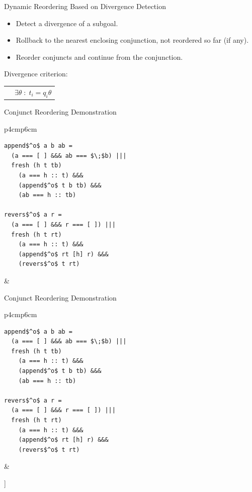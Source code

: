 \documentclass{beamer}
\theoremstyle{definition}
\theoremstyle{plain} %
\begin{document}
\begin{frame}{Dynamic Reordering Based on Divergence Detection}
\vskip5mm
\begin{itemize}
  \item Detect a divergence of a subgoal.
  \item Rollback to the nearest enclosing conjunction, not reordered so far (if any).
  \item Reorder conjuncts and continue from the conjunction. 
\end{itemize}

\vskip8mm
Divergence criterion:
 
\begin{center}
\begin{tabular}{cc}
\noindent\parbox[c]{0.3\hsize}{\Tree [.{$f\;(t_1,\dots,t_k)$} [.{$\dots$} [.{$f\;(q_1,\dots,q_k)$} ] ] ]} & $\exists\theta\;:\;t_i=q_i\theta$
\end{tabular}
\end{center}


\end{frame}

\begin{frame}[fragile]{Conjunct Reordering Demonstration}
  \begin{tabular}{p{4cm}p{6cm}}
    \begin{lstlisting}
append$^o$ a b ab =		
  (a === [ ] &&& ab === $\;$b) |||
  fresh (h t tb) 
    (a === h :: t) &&&
    (append$^o$ t b tb) &&&
    (ab === h :: tb)  
  
revers$^o$ a r =	
  (a === [ ] &&& r === [ ]) |||
  fresh (h t rt) 
    (a === h :: t) &&&
    (append$^o$ rt [h] r) &&&
    (revers$^o$ t rt)
\end{lstlisting}
&
\begin{center}
\end{center}
\end{tabular}
\end{frame}

\begin{frame}[fragile]{Conjunct Reordering Demonstration}
  \begin{tabular}{p{4cm}p{6cm}}
    \begin{lstlisting}
append$^o$ a b ab =		
  (a === [ ] &&& ab === $\;$b) |||
  fresh (h t tb) 
    (a === h :: t) &&&
    (append$^o$ t b tb) &&&
    (ab === h :: tb)  
  
revers$^o$ a r =	
  (a === [ ] &&& r === [ ]) |||
  fresh (h t rt) 
    (a === h :: t) &&&
    (append$^o$ rt [h] r) &&&
    (revers$^o$ t rt)
\end{lstlisting}
&
\begin{center}
   \Tree [.{\lstinline|revers$^o\; [1,\,2,\,3]\; r$|}  [.{$[1,\,2,\,3]\not\equiv [\;]$} ] [.{$\ldots$} ] ]
\end{center}
\end{tabular}
\end{frame}
\end{document}
